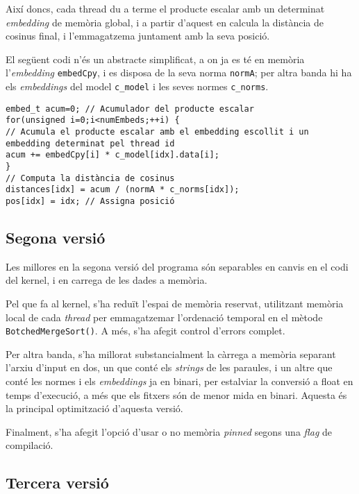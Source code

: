 \documentclass[catalan,10pt,a4paper]{article}
\begin{document}
Així doncs, cada thread du a terme el producte escalar amb un determinat \textit{embedding} de memòria global, i a partir d'aquest en calcula la distància de cosinus final, i l'emmagatzema juntament amb la seva posició. 

El següent codi n'és un abstracte simplificat, a on ja es té en memòria l'\textit{embedding} \texttt{embedCpy}, i es disposa de la seva norma \texttt{normA}; per altra banda hi ha els \textit{embeddings} del model \texttt{c_model} i les seves normes \texttt{c_norms}. 

\begin{verbatim}
embed_t acum=0; // Acumulador del producte escalar
for(unsigned i=0;i<numEmbeds;++i) {
// Acumula el producte escalar amb el embedding escollit i un embedding determinat pel thread id
acum += embedCpy[i] * c_model[idx].data[i];
}
// Computa la distància de cosinus
distances[idx] = acum / (normA * c_norms[idx]);
pos[idx] = idx; // Assigna posició
\end{verbatim}

\subsection*{Segona versió}

Les millores en la segona versió del programa són separables en canvis en el codi del kernel, i en carrega de les dades a memòria.

Pel que fa al kernel, s'ha reduït l'espai de memòria reservat, utilitzant memòria local de cada \textit{thread} per emmagatzemar l'ordenació temporal en el mètode \verb|BotchedMergeSort()|. A més, s'ha afegit control d'errors complet.

Per altra banda, s'ha millorat substancialment la càrrega a memòria separant l'arxiu d'input en dos, un que conté els \textit{strings} de les paraules, i un altre que conté les normes i els \textit{embeddings} ja en binari, per estalviar la conversió a float en temps d'execució, a més que els fitxers són de menor mida en binari. Aquesta és la principal optimització d'aquesta versió.

Finalment, s'ha afegit l'opció d'usar o no memòria \textit{pinned} segons una \textit{flag} de compilació.


\subsection*{Tercera versió}\label{sec:v3}
\end{document}
